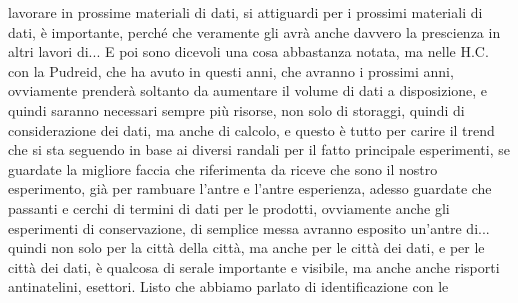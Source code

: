 lavorare in prossime materiali di dati, si attiguardi per i prossimi materiali di dati, è importante, perché che veramente gli avrà anche davvero la prescienza in altri lavori di... E poi sono dicevoli una cosa abbastanza notata, ma nelle H.C. con la Pudreid, che ha avuto in questi anni, che avranno i prossimi anni, ovviamente prenderà soltanto da aumentare il volume di dati a disposizione, e quindi saranno necessari sempre più risorse, non solo di storaggi, quindi di considerazione dei dati, ma anche di calcolo, e questo è tutto per carire il trend che si sta seguendo in base ai diversi randali per il fatto principale esperimenti, se guardate la migliore faccia che riferimenta da riceve che sono il nostro esperimento, già per rambuare l'antre e l'antre esperienza, adesso guardate che passanti e cerchi di termini di dati per le prodotti, ovviamente anche gli esperimenti di conservazione, di semplice messa avranno esposito un'antre di... quindi non solo per la città della città, ma anche per le città dei dati, e per le città dei dati, è qualcosa di serale importante e visibile, ma anche anche risporti antinatelini, esettori. Listo che abbiamo parlato di identificazione con le

